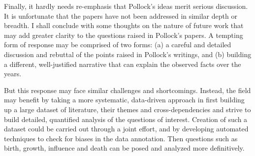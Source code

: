 Finally, it hardly needs re-emphasis that Pollock’s ideas merit serious discussion. It is unfortunate that the papers have not been addressed in similar depth or breadth. I shall conclude with some thoughts on the nature of future work that may add greater clarity to the questions raised in Pollock’s papers. A tempting form of response may be comprised of two forms: (a) a careful and detailed discussion and rebuttal of the points raised in Pollock’s writings, and (b) building a different, well-justified narrative that can explain the observed facts over the years. 

But this response may face similar challenges and shortcomings. Instead, the field may benefit by taking a more systematic, data-driven approach in first building up a large dataset of literature, their themes and cross-dependencies and strive to build detailed, quantified analysis of the questions of interest. Creation of such a dataset could be carried out through a joint effort, and by developing automated techniques to check for biases in the data annotation. Then questions such as birth, growth, influence and death can be posed and analyzed more definitively.
\newpage

